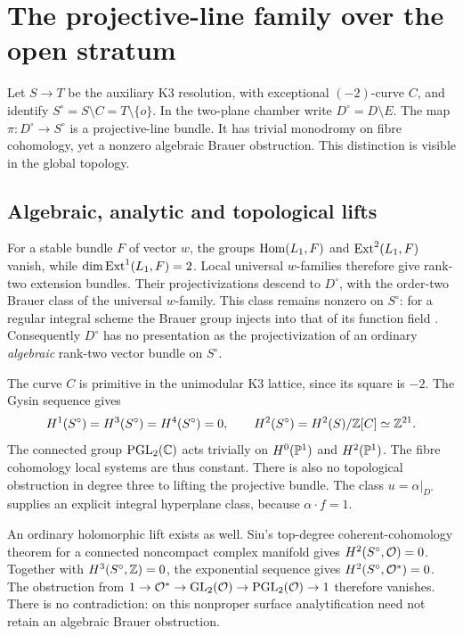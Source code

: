 \section{The projective-line family over the open stratum}\label{sec:projective-family}

Let $S\to T$ be the auxiliary K3 resolution, with
exceptional $(-2)$-curve $C$, and identify
$S^\circ=S\setminus C=T\setminus\{o\}$.
In the two-plane chamber write $D^\circ=D\setminus E$.
The map $\pi:D^\circ\to S^\circ$ is a projective-line
bundle. It has trivial monodromy on fibre cohomology,
yet a nonzero algebraic Brauer obstruction. This
distinction is visible in the global topology.

\subsection{Algebraic, analytic and topological lifts}
For a stable bundle $F$ of vector $w$, the groups
$\operatorname{Hom}(L_1,F)$ and $\operatorname{Ext}^2(L_1,F)$ vanish, while
$\dim\operatorname{Ext}^1(L_1,F)=2$. Local universal $w$-families
therefore give rank-two extension bundles. Their
projectivizations descend to $D^\circ$, with the
order-two Brauer class of the universal $w$-family.
This class remains nonzero on $S^\circ$: for a
regular integral scheme the Brauer group injects
into that of its function field
\cite[Corollaries~1.8 and~1.10]{grothendieckbrauer}.
Consequently $D^\circ$ has no presentation as the
projectivization of an ordinary \emph{algebraic}
rank-two vector bundle on $S^\circ$.

The curve $C$ is primitive in the unimodular K3
lattice, since its square is $-2$. The Gysin
sequence gives
\begin{equation}\label{eq:open-surface-cohomology}
 H^1(S^\circ)=H^3(S^\circ)=H^4(S^\circ)=0,
 \qquad H^2(S^\circ)=H^2(S)/\mathbb Z[C]\simeq\mathbb Z^{21}.
\end{equation}
The connected group $\mathrm{PGL}_2(\mathbb C)$ acts
trivially on $H^0(\mathbb P^1)$ and $H^2(\mathbb P^1)$.
The fibre cohomology local systems are thus
constant. There is also no topological obstruction
in degree three to lifting the projective bundle.
The class $u=\alpha|_{D^\circ}$ supplies an explicit
integral hyperplane class, because $\alpha\cdot f=1$.

An ordinary holomorphic lift exists as well. Siu's
top-degree coherent-cohomology theorem for a
connected noncompact complex manifold
\cite{siu} gives $H^2(S^\circ,\mathcal O)=0$.
Together with $H^3(S^\circ,\mathbb Z)=0$, the exponential
sequence gives $H^2(S^\circ,\mathcal O^*)=0$. The obstruction
from $1\to\mathcal O^*\to\mathrm{GL}_2(\mathcal O)
\to\mathrm{PGL}_2(\mathcal O)\to1$ therefore vanishes.
There is no contradiction: on this nonproper
surface analytification need not retain an
algebraic Brauer obstruction.

